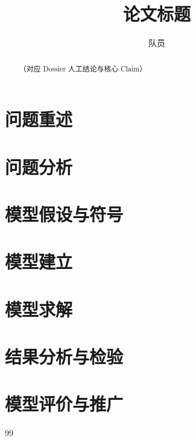 \documentclass[UTF8,a4paper,12pt]{ctexart}
\title{论文标题}
\author{队员}
\date{}
\begin{document}
\maketitle
\begin{abstract}
（对应 Dossier 人工结论与核心 Claim）
\end{abstract}
\section{问题重述}
\section{问题分析}
\section{模型假设与符号}
\section{模型建立}
\section{模型求解}
\section{结果分析与检验}
\section{模型评价与推广}
\begin{thebibliography}{99}
\end{thebibliography}
\end{document}
